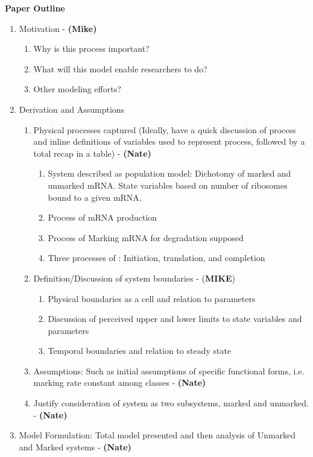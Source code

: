 \documentclass[review]{elsarticle}
\begin{document}
\textbf{Paper Outline}
\begin{enumerate}
\item Motivation - \textbf{(Mike)}
\begin{enumerate}
\item Why is this process important?
\item What will this model enable researchers to do?
\item Other modeling efforts?
\end{enumerate}
\item Derivation and Assumptions
\begin{enumerate}
\item Physical processes captured (Ideally, have a quick discussion of process and inline definitions of variables used to represent process, followed by a total recap in a table)  - \textbf{(Nate)}
\begin{enumerate}
\item System described as population model: Dichotomy of marked and unmarked mRNA. State variables based on number of ribosomes bound to a given mRNA. 
\item Process of mRNA production
\item Process of Marking mRNA for degradation supposed
\item Three processes of : Initiation, translation, and completion
\end{enumerate}
\item Definition/Discussion of system boundaries - (\textbf{MIKE})
\begin{enumerate}
\item Physical boundaries as a cell and relation to parameters
\item Discussion of perceived upper and lower limits to state variables and parameters
\item Temporal boundaries and relation to steady state
\end{enumerate}
\item Assumptions: Such as initial assumptions of specific functional forms, i.e. marking rate constant among classes  - \textbf{(Nate)}
\item Justify consideration of system as two subsystems, marked and unmarked.  - \textbf{(Nate)}
\end{enumerate}
\item Model Formulation: Total model presented and then analysis of Unmarked and Marked systems  - \textbf{(Nate)}

\end{enumerate}
\end{document}
